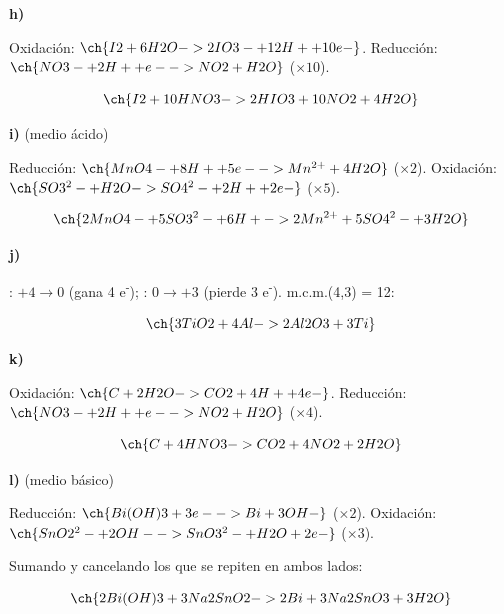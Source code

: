 \begin{exercise}
\begin{solu}
        \textbf{h) }

        Oxidación: \(\ch{I2 + 6 H2O -> 2 IO3- + 12 H+ + 10 e-}\). Reducción: \(\ch{NO3- + 2 H+ + e- -> NO2 + H2O}\) (\(\times 10\)).

        \begin{equation*}
            \ch{I2 + 10 HNO3 -> 2 HIO3 + 10 NO2 + 4 H2O}
        \end{equation*}

        \textbf{i) } (medio ácido)

        Reducción: \(\ch{MnO4- + 8 H+ + 5 e- -> Mn^{2+} + 4 H2O}\) (\(\times 2\)). Oxidación: \(\ch{SO3^2- + H2O -> SO4^2- + 2 H+ + 2 e-}\) (\(\times 5\)).

        \begin{equation*}
            \ch{2 MnO4- + 5 SO3^2- + 6 H+ -> 2 Mn^{2+} + 5 SO4^2- + 3 H2O}
        \end{equation*}

        \textbf{j) }

        : \(+4 \to 0\) (gana 4 e\textsuperscript{-}); : \(0 \to +3\) (pierde 3 e\textsuperscript{-}). m.c.m.(4,3) = 12:

        \begin{equation*}
            \ch{3 TiO2 + 4 Al -> 2 Al2O3 + 3 Ti}
        \end{equation*}

        \textbf{k) }

        Oxidación: \(\ch{C + 2 H2O -> CO2 + 4 H+ + 4 e-}\). Reducción: \(\ch{NO3- + 2 H+ + e- -> NO2 + H2O}\) (\(\times 4\)).

        \begin{equation*}
            \ch{C + 4 HNO3 -> CO2 + 4 NO2 + 2 H2O}
        \end{equation*}

        \textbf{l) } (medio básico)

        Reducción: \(\ch{Bi(OH)3 + 3 e- -> Bi + 3 OH-}\) (\(\times 2\)). Oxidación: \(\ch{SnO2^2- + 2 OH- -> SnO3^2- + H2O + 2 e-}\) (\(\times 3\)).

        Sumando y cancelando los  que se repiten en ambos lados:

        \begin{equation*}
            \ch{2 Bi(OH)3 + 3 Na2SnO2 -> 2 Bi + 3 Na2SnO3 + 3 H2O}
        \end{equation*}

    \end{solu}
\end{exercise}

